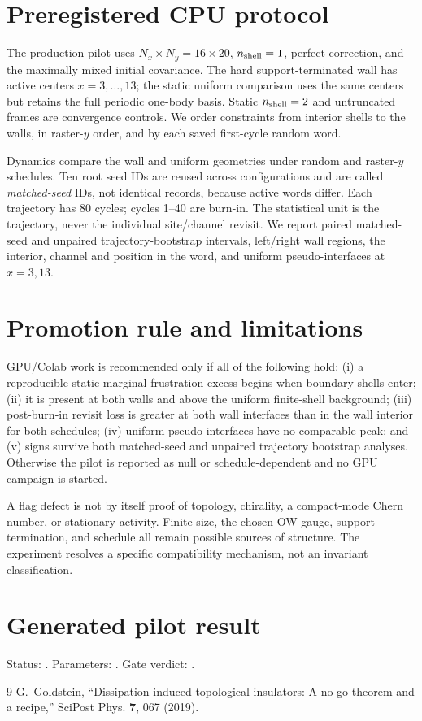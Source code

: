 \documentclass[aps,prb,onecolumn,nofootinbib,superscriptaddress]{revtex4-2}
\begin{document}
\section{Preregistered CPU protocol}

The production pilot uses $N_x\times N_y=16\times20$, $n_{\rm shell}=1$, perfect
correction, and the maximally mixed initial covariance.  The hard support-terminated
wall has active centers $x=3,\ldots,13$; the static uniform comparison uses the same
centers but retains the full periodic one-body basis.  Static $n_{\rm shell}=2$ and
untruncated frames are convergence controls.  We order constraints from interior shells
to the walls, in raster-$y$ order, and by each saved first-cycle random word.

Dynamics compare the wall and uniform geometries under random and raster-$y$ schedules.
Ten root seed IDs are reused across configurations and are called \emph{matched-seed}
IDs, not identical records, because active words differ.  Each trajectory has 80 cycles;
cycles 1--40 are burn-in.  The statistical unit is the trajectory, never the individual
site/channel revisit.  We report paired matched-seed and unpaired trajectory-bootstrap
intervals, left/right wall regions, the interior, channel and position in the word, and
uniform pseudo-interfaces at $x=3,13$.

\section{Promotion rule and limitations}

GPU/Colab work is recommended only if all of the following hold: (i) a reproducible
static marginal-frustration excess begins when boundary shells enter; (ii) it is present
at both walls and above the uniform finite-shell background; (iii) post-burn-in revisit
loss is greater at both wall interfaces than in the wall interior for both schedules;
(iv) uniform pseudo-interfaces have no comparable peak; and (v) signs survive both
matched-seed and unpaired trajectory bootstrap analyses.  Otherwise the pilot is
reported as null or schedule-dependent and no GPU campaign is started.

A flag defect is not by itself proof of topology, chirality, a compact-mode Chern
number, or stationary activity.  Finite size, the chosen OW gauge, support termination,
and schedule all remain possible sources of structure.  The experiment resolves a
specific compatibility mechanism, not an invariant classification.

\section{Generated pilot result}



Status: \PilotStatus.  Parameters: \PilotParameters.  Gate verdict: \PilotVerdict.

\begin{thebibliography}{9}
G.~Goldstein, ``Dissipation-induced topological insulators: A no-go theorem and a
recipe,'' SciPost Phys. \textbf{7}, 067 (2019).
\end{thebibliography}
\end{document}
